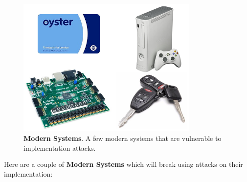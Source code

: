 \begin{figure}[!ht]
    \centering
    \includegraphics[width=0.8\textwidth]{images/ch1_Intro/modern_systems.png}
    \caption{\textbf{Modern Systems}. A few modern systems that are vulnerable to implementation attacks.}
    \label{fig:Modern Systems}
\end{figure}

Here are a couple of \textbf{Modern Systems} which will break using attacks on their
implementation:

